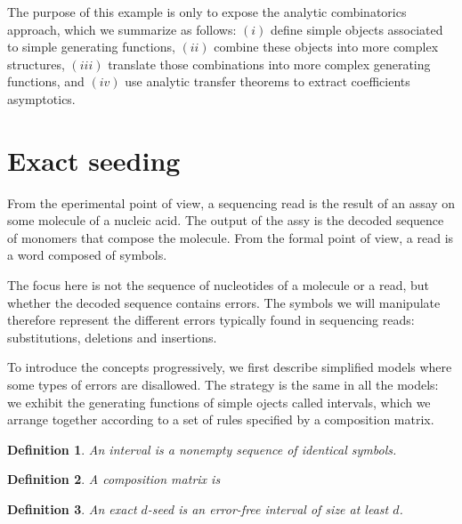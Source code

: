 \documentclass{article}
\newtheorem{definition}{Definition}
\begin{document}
The purpose of this example is only to expose the analytic combinatorics
approach, which we summarize as follows: $(i)$ define simple objects
associated to simple generating functions, $(ii)$ combine these objects
into more complex structures, $(iii)$ translate those combinations into
more complex generating functions, and $(iv)$ use analytic transfer
theorems to extract coefficients asymptotics.











\section{Exact seeding}

From the eperimental point of view, a sequencing read is the result of an
assay on some molecule of a nucleic acid. The output of the assy is the
decoded sequence of monomers that compose the molecule. From the formal
point of view, a read is a word composed of symbols.

The focus here is not the sequence of nucleotides of a molecule or a read,
but whether the decoded sequence contains errors. The symbols we will
manipulate therefore represent the different errors typically found in
sequencing reads: substitutions, deletions and insertions.

To introduce the concepts progressively, we first describe simplified
models where some types of errors are disallowed. The strategy is the same
in all the models: we exhibit the generating functions of simple ojects
called intervals, which we arrange together according to a set of rules
specified by a composition matrix.

\begin{definition}
\label{def:interval}
An interval is a nonempty sequence of identical symbols.
\end{definition}

\begin{definition}
A composition matrix is
\end{definition}



\begin{definition}
\label{def:seed}
An exact $d$-seed is an error-free interval of size at least $d$.
\end{definition}
\end{document}
